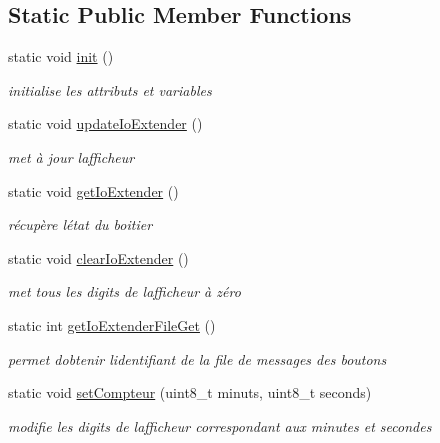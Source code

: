 \subsection*{Static Public Member Functions}
\begin{DoxyCompactItemize}
\item 
static void \hyperlink{class_salf_box_ihm_a0d0f3f0595146757c529e06e3006ac50}{init} ()
\begin{DoxyCompactList}\small\item\em initialise les attributs et variables \end{DoxyCompactList}\item 
static void \hyperlink{class_salf_box_ihm_a07966fefea031c574b51c72862dfca61}{update\+Io\+Extender} ()
\begin{DoxyCompactList}\small\item\em met à jour l\textquotesingle{}afficheur \end{DoxyCompactList}\item 
static void \hyperlink{class_salf_box_ihm_ab6f403e3660ecddbabb147a3d194d1e1}{get\+Io\+Extender} ()
\begin{DoxyCompactList}\small\item\em récupère l\textquotesingle{}état du boitier \end{DoxyCompactList}\item 
static void \hyperlink{class_salf_box_ihm_a1d898e4cc39968da624912a2abd0ebe9}{clear\+Io\+Extender} ()
\begin{DoxyCompactList}\small\item\em met tous les digits de l\textquotesingle{}afficheur à zéro \end{DoxyCompactList}\item 
static int \hyperlink{class_salf_box_ihm_aebeee5ca5aa174e6d79262c6f59dffa7}{get\+Io\+Extender\+File\+Get} ()
\begin{DoxyCompactList}\small\item\em permet d\textquotesingle{}obtenir l\textquotesingle{}identifiant de la file de messages des boutons \end{DoxyCompactList}\item 
static void \hyperlink{class_salf_box_ihm_a540d7a30e9dbdea8c9ec4542543e9a00}{set\+Compteur} (uint8\+\_\+t minuts, uint8\+\_\+t seconds)
\begin{DoxyCompactList}\small\item\em modifie les digits de l\textquotesingle{}afficheur correspondant aux minutes et secondes \end{DoxyCompactList}\item 

\end{DoxyCompactItemize}
